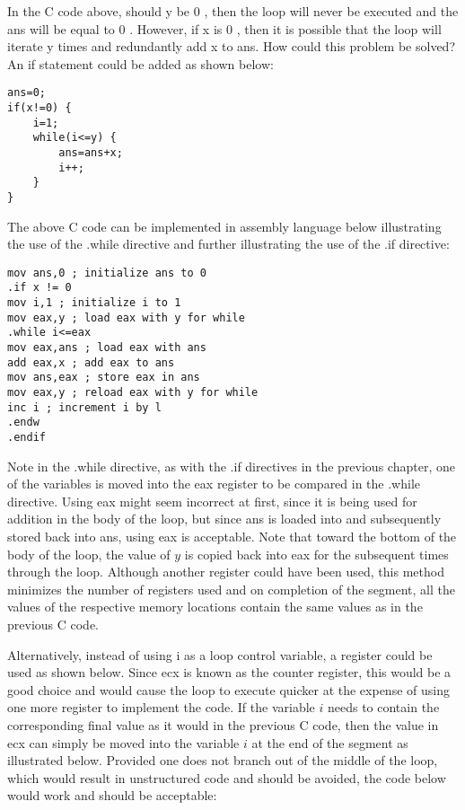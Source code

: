 \documentclass[10pt]{article}
\begin{document}
In the C code above, should y be 0 , then the loop will never be executed and the ans will be equal to 0 . However, if x is 0 , then it is possible that the loop will iterate y times and redundantly add x to ans. How could this problem be solved? An if statement could be added as shown below:

\begin{verbatim}
ans=0;
if(x!=0) {
    i=1;
    while(i<=y) {
        ans=ans+x;
        i++;
    }
}
\end{verbatim}

The above C code can be implemented in assembly language below illustrating the use of the .while directive and further illustrating the use of the .if directive:

\begin{verbatim}
mov ans,0 ; initialize ans to 0
.if x != 0
mov i,1 ; initialize i to 1
mov eax,y ; load eax with y for while
.while i<=eax
mov eax,ans ; load eax with ans
add eax,x ; add eax to ans
mov ans,eax ; store eax in ans
mov eax,y ; reload eax with y for while
inc i ; increment i by l
.endw
.endif
\end{verbatim}

Note in the .while directive, as with the .if directives in the previous chapter, one of the variables is moved into the eax register to be compared in the .while directive. Using eax might seem incorrect at first, since it is being used for addition in the body of the loop, but since ans is loaded into and subsequently stored back into ans, using eax is acceptable. Note that toward the bottom of the body of the loop, the value of $y$ is copied back into eax for the subsequent times through the loop. Although another register could have been used, this method minimizes the number of registers used and on completion of the segment, all the\\
values of the respective memory locations contain the same values as in the previous C code.

Alternatively, instead of using i as a loop control variable, a register could be used as shown below. Since ecx is known as the counter register, this would be a good choice and would cause the loop to execute quicker at the expense of using one more register to implement the code. If the variable $i$ needs to contain the corresponding final value as it would in the previous C code, then the value in ecx can simply be moved into the variable $i$ at the end of the segment as illustrated below. Provided one does not branch out of the middle of the loop, which would result in unstructured code and should be avoided, the code below would work and should be acceptable:
\end{document}
